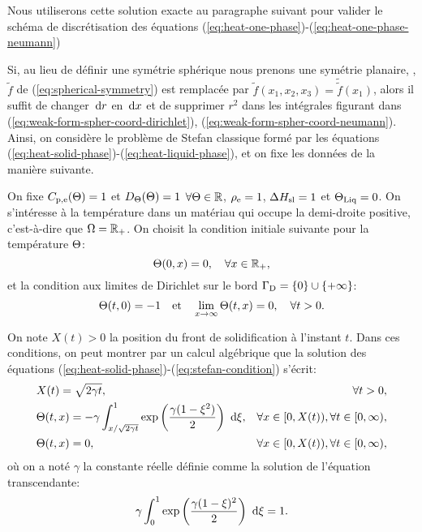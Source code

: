 Nous utiliserons cette solution exacte au paragraphe suivant pour valider le
schéma de discrétisation des équations
(\ref{eq:heat-one-phase})-(\ref{eq:heat-one-phase-neumann})

Si, au lieu de définir une symétrie sphérique nous prenons une
symétrie planaire, \ie, $\tilde f$ de (\ref{eq:spherical-symmetry})
est remplacée par $\tilde f(x_1, x_2, x_3) = \tilde{\tilde f}(x_1)$,
alors il suffit de changer $\,\mathrm dr$ en $\,\mathrm dx$ et de supprimer
$r^2$ dans les intégrales figurant dans
(\ref{eq:weak-form-spher-coord-dirichlet}),
(\ref{eq:weak-form-spher-coord-neumann}). Ainsi, on considère le
problème de Stefan classique formé par les équations
(\ref{eq:heat-solid-phase})-(\ref{eq:heat-liquid-phase}), et on fixe
les données de la manière suivante.


On fixe $C_{\mathrm{p,e}}(\Theta) = 1$ et
$D_\Theta(\Theta)=1$ $\forall\Theta \in \mathbb
R$, $\rho_\mathrm{e} = 1$, $\Delta H_\mathrm{sl} = 1$ et $\Theta_\text{Liq} =
0$. On s'intéresse à la température dans un matériau qui occupe la
demi-droite positive, c'est-à-dire que $\Omega = \mathbb R_+$. On choisit
la condition initiale suivante pour la température $\Theta$:
\begin{equation}
  \Theta(0, x) = 0, \quad \forall x\in\mathbb R_+,
\end{equation}
et la condition aux limites de Dirichlet sur le bord $\Gamma_\mathrm{D} =
\left\{ 0 \right\}\cup \left\{ +\infty \right\}$:
\begin{equation}
  \Theta(t, 0) = -1 \quad\text{et}\quad
  \lim_{x\to\infty}\Theta(t, x) = 0, \quad \forall t > 0.
\end{equation}

On note $X(t) > 0$ la position du front de solidification à l'instant
$t$. Dans ces conditions, on peut montrer \cite{HillStefanProblems}
par un calcul algébrique que la solution des équations
(\ref{eq:heat-solid-phase})-(\ref{eq:stefan-condition}) s'écrit:
\begin{align}
  & X(t) = \sqrt{2\gamma t},& \forall t >
  0,\label{eq:neumann-sol-frontier}\\
  & \temperature(t, x) = -\gamma\int_{x / \sqrt{2\gamma
      t}}^1\exp\parent{\frac{\gamma(1 - \xi^2)}{2}}\, \intd{\xi},%
  & \forall x \in [0,X(t)),
    \forall t \in [0,\infty),\label{eq:neumann-sol-solid-phase}\\
  & \temperature(t, x) = 0,
  & \forall x \in [0,X(t)),
    \forall t \in [0,\infty),\label{eq:neumann-sol-liquid-phase}
\end{align}
où on a noté $\gamma$ la constante réelle définie comme la solution de
l'équation transcendante:
\begin{equation}
  \gamma \int_0^1\exp\left( \frac{\gamma(1 - \xi)^2}{2} \right)\,\,\mathrm d\xi
  = 1.
\end{equation}

